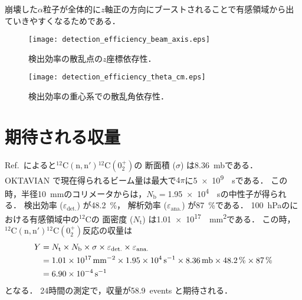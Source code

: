 \documentclass[../master]{subfiles}
\begin{document}
崩壊した$\alpha$粒子が全体的に$z$軸正の方向にブーストされることで有感領域から出ていきやすくなるためである．
\begin{figure}
  \centering
  \texttt{[image: detection\_efficiency\_beam\_axis.eps]}
  \caption{検出効率の散乱点の$z$座標依存性．}
  \label{fig::detection_efficiency_beam_axis}
\end{figure}
\begin{figure}
  \centering
  \texttt{[image: detection\_efficiency\_theta\_cm.eps]}
  \caption{検出効率の重心系での散乱角依存性．}
  \label{fig::detection_efficiency_theta_cm}
\end{figure}

\section{期待される収量}
Ref.~\cite{takahashietal,kondoetal}によると${}^{12}\mathrm{C}(\mathrm{n},\mathrm{n}'){}^{12}\mathrm{C}(0_{2}^{+})$の
断面積 ($\sigma$) は\SI{8.36}{\milli\barn}である．
OKTAVIAN で現在得られるビーム量は最大で$4\pi$に\SI{5e9}{\per\second}である．
この時，半径\SI{10}{\milli\metre}のコリメータからは，$N_{\text{b}}=$\SI{1.95e4}{\per\second}の中性子が得られる．
検出効率 ($\varepsilon_{\text{det.}}$) が\SI{48.2}{\percent}，
解析効率 ($\varepsilon_{\text{ana.}}$) が\SI{87}{\percent}である．
\SI{100}{\hecto\pascal}の\isoButaneHydro における有感領域中の${}^{12}\mathrm{C}$の
面密度 ($N_{\text{t}}$) は\SI{1.01e17}{\per\square\milli\metre}である．
この時，${}^{12}\mathrm{C}(\mathrm{n},\mathrm{n}'){}^{12}\mathrm{C}(0_{2}^{+})$反応の収量は
\begin{align}
  Y &= N_{\text{t}}\times N_{\text{b}}\times \sigma \times\varepsilon_{\text{det.}}\times\varepsilon_{\text{ana.}} \notag\\
  &= \SI{1.01e17}{\per\square\milli\metre}\times\SI{1.95e4}{\per\second}\times\SI{8.36}{\milli\barn}
  \times\SI{48.2}{\percent}\times\SI{87}{\percent} \notag\\
  &= \SI{6.90e-4}{\per\second}
\end{align}
となる．
24時間の測定で，収量が58.9~events と期待される．
\end{document}
